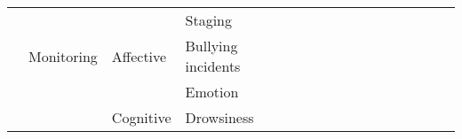 \begin{tabular}{p{1.5cm}p{1.5cm}p{1.5cm}p{1.5cm}p{0.6cm}p{0.6cm}p{0.6cm}p{0.6cm}p{0.6cm}p{0.6cm}p{0.6cm}p{0.6cm}p{0.6cm}p{0.6cm}p{0.6cm}}
                                &                 &                   & Staging &                          \cite{Langkvist2018, Tripathy2018} &                    \cite{Patanaik2018, Phan2018, Sors2018, Chambon2018, Vilamala2017, Xie2017, Manzano2017a, Tsinalis2016a} &                                        \cite{Supratak2017, Biswal2017} &                 \cite{Langkvist2012} &                                                            &                      &                         &                               &                     &                         &                                       \cite{dong2018mixed, Giri2016} \\
                                & Monitoring & Affective & Bullying incidents &                                                             &                                                                                                        \cite{Baltatzis2017} &                                                                        &                                      &                                                            &                      &                         &                               &                     &                         &                                                                      \\
                                &                 &                   & Emotion &  \cite{BenSaid2017a, Xu2016, Liu2016, Jirayucharoensak2014} &                                                                                                    \cite{Liao2018, Lin2017} &                                                                        &  \cite{Zheng2015, Zheng2014, Li2013} &                             \cite{Teo2018, Frydenlund2015} &                      &                         &  \cite{Mehmood2017, Kwon2017} &                     &      \cite{gao2015deep} &                                \cite{Li2018, Zhang2018, Alhagry2017} \\
                                &                 & Cognitive & Drowsiness &                                                             &                                                                                                                             &                                                                        &                                      &                                                            &                      &                         &                               &                     &  \cite{Hajinoroozi2015} &                                                                      \\

\end{tabular}
